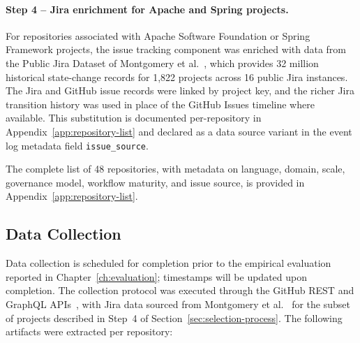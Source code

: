 \paragraph{Step 4 – Jira enrichment for Apache and Spring projects.}
For repositories associated with Apache Software Foundation or Spring
Framework projects, the issue tracking component was enriched with data
from the Public Jira Dataset of Montgomery et
al.~\cite{montgomery2022jira}, which provides 32 million historical
state-change records for 1,822 projects across 16 public Jira instances.
The Jira and GitHub issue records were linked by project key, and the
richer Jira transition history was used in place of the GitHub Issues
timeline where available. This substitution is documented
per-repository in Appendix~\ref{app:repository-list} and declared as a
data source variant in the event log metadata field
\texttt{issue\_source}.

The complete list of 48 repositories, with metadata on language, domain,
scale, governance model, workflow maturity, and issue source, is
provided in Appendix~\ref{app:repository-list}.


\subsection{Data Collection}
\label{sec:data-collection}

Data collection is scheduled for completion prior to the empirical
evaluation reported in Chapter~\ref{ch:evaluation}; timestamps will be
updated upon completion. The collection protocol was executed through the
GitHub REST and GraphQL APIs~\cite{github2023api}, with Jira data
sourced from Montgomery et al.~\cite{montgomery2022jira} for the subset
of projects described in Step~4 of
Section~\ref{sec:selection-process}. The following artifacts were
extracted per repository:

